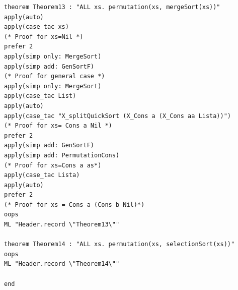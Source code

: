 \documentclass[12pt,twoside]{article}
\numberwithin{spec}{subsection}
\numberwithin{proof}{subsection}
\numberwithin{figure}{subsection}
\numberwithin{code}{subsection}
\begin{document}
\begin{multicols}{2}
\begin{verbatim}
theorem Theorem13 : "ALL xs. permutation(xs, mergeSort(xs))"
apply(auto)
apply(case_tac xs)
(* Proof for xs=Nil *)
prefer 2
apply(simp only: MergeSort)
apply(simp add: GenSortF)
(* Proof for general case *)
apply(simp only: MergeSort)
apply(case_tac List)
apply(auto)
apply(case_tac "X_splitQuickSort (X_Cons a (X_Cons aa Lista))")
(* Proof for xs= Cons a Nil *)
prefer 2
apply(simp add: GenSortF)
apply(simp add: PermutationCons)
(* Proof for xs=Cons a as*)
apply(case_tac Lista)
apply(auto)
prefer 2
(* Proof for xs = Cons a (Cons b Nil)*)
oops
ML "Header.record \"Theorem13\""

theorem Theorem14 : "ALL xs. permutation(xs, selectionSort(xs))"
oops
ML "Header.record \"Theorem14\""

end
\end{verbatim}
\end{multicols}
\end{document}

